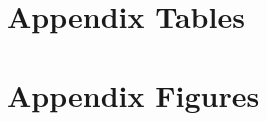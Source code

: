 \documentclass{article}
\newcommand{\MMRfolder}{"."}
\begin{document}
\begin{spacing}{1.4}
\newpage
\section{Appendix Tables}
\label{scn:appTables}


\newpage
\section{Appendix Figures}
\label{scn:appFigures}



\newpage



\end{spacing}
\end{document}
